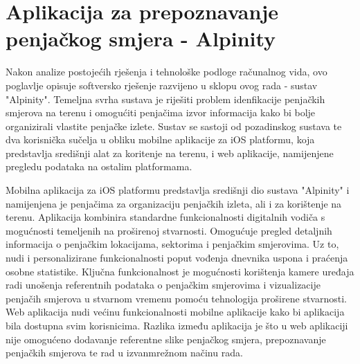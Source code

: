 \chapter{Aplikacija za prepoznavanje penjačkog smjera - Alpinity}

Nakon analize postojećih rješenja i tehnološke podloge računalnog vida, ovo poglavlje opisuje softversko rješenje razvijeno u sklopu ovog rada - sustav "Alpinity". Temeljna svrha sustava je riješiti problem idenfikacije penjačkih smjerova na terenu i omogućiti penjačima izvor informacija kako bi bolje organizirali vlastite penjačke izlete. Sustav se sastoji od pozadinskog sustava te dva korisnička sučelja u obliku mobilne aplikacije za iOS platformu, koja predstavlja središnji alat za koritenje na terenu, i web aplikacije, namijenjene pregledu podataka na ostalim platformama. 

Mobilna aplikacija za iOS platformu predstavlja središnji dio sustava "Alpinity" i namijenjena je penjačima za organizaciju penjačkih izleta, ali i za korištenje na terenu. Aplikacija kombinira standardne funkcionalnosti digitalnih vodiča s mogućnosti temeljenih na proširenoj stvarnosti. Omogućuje pregled detaljnih informacija o penjačkim lokacijama, sektorima i penjačkim smjerovima. Uz to, nudi i personalizirane funkcionalnosti poput vođenja dnevnika uspona i praćenja osobne statistike. 
Ključna funkcionalnost je mogućnosti korištenja kamere uređaja radi unošenja referentnih podataka o penjačkim smjerovima i vizualizacije penjačih smjerova u stvarnom vremenu pomoću tehnologija proširene stvarnosti. Web aplikacija nudi većinu funkcionalnosti mobilne aplikacije kako bi aplikacija bila dostupna svim korisnicima. Razlika između aplikacija je što u web aplikaciji nije omogućeno dodavanje referentne slike penjačkog smjera, prepoznavanje penjačkih smjerova te rad u izvanmrežnom načinu rada. 











